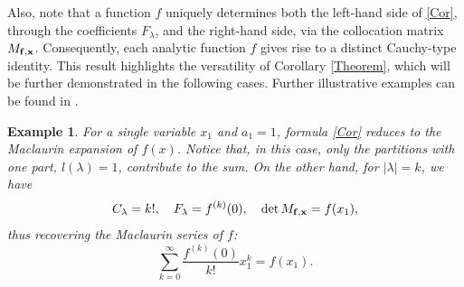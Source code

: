 \documentclass[smallextended]{svjour3}       %
\newtheorem{exmp}{Example}
\begin{document}
 
Also, note that a function \(f\) uniquely determines both the left-hand side of \eqref{Cor}, through the coefficients \(F_\lambda\), and the right-hand side, via the collocation matrix \(M_{\bf f,  \bf x}\). Consequently, each analytic function \(f\) gives rise to a distinct Cauchy-type identity. This result highlights the versatility of Corollary \ref{Theorem}, which will be further demonstrated in the following cases. Further illustrative examples can be found in \cite{DM}.
 

 
\begin{exmp}
For a single variable $x_1$ and $a_1=1$, formula \eqref{Cor} reduces to the Maclaurin expansion of \(f(x)\). Notice that, in this case, only the partitions with one part, $l(\lambda)=1$, contribute to the sum. On the other hand, for $|\lambda|=k$, we have
\begin{equation*}
    C_\lambda = k!, \quad F_\lambda = f^{(k)}(0), \quad \det M_{\bf f,  \bf x} = f(x_1),
\end{equation*}
thus recovering the Maclaurin series of $f$:
\[
\sum_{k=0}^\infty \frac{ f^{(k)} (0) }{k!}x_1^k=f(x_1).
\]
\end{exmp}
\end{document}
